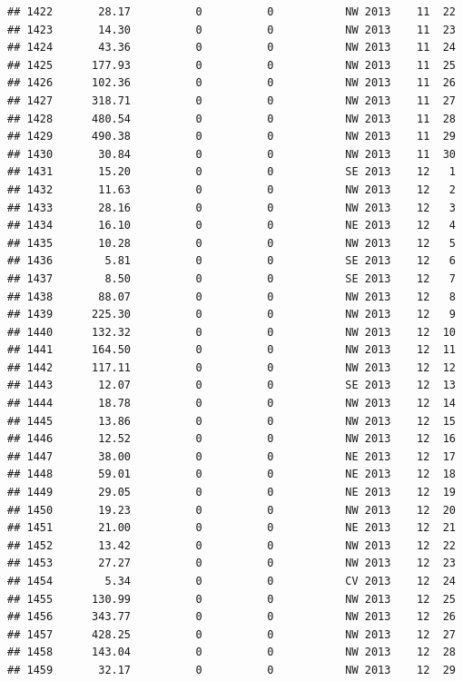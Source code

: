 \documentclass[
]{article}
\begin{document}
\begin{verbatim}
## 1422       28.17          0          0           NW 2013    11  22
## 1423       14.30          0          0           NW 2013    11  23
## 1424       43.36          0          0           NW 2013    11  24
## 1425      177.93          0          0           NW 2013    11  25
## 1426      102.36          0          0           NW 2013    11  26
## 1427      318.71          0          0           NW 2013    11  27
## 1428      480.54          0          0           NW 2013    11  28
## 1429      490.38          0          0           NW 2013    11  29
## 1430       30.84          0          0           NW 2013    11  30
## 1431       15.20          0          0           SE 2013    12   1
## 1432       11.63          0          0           NW 2013    12   2
## 1433       28.16          0          0           NW 2013    12   3
## 1434       16.10          0          0           NE 2013    12   4
## 1435       10.28          0          0           NW 2013    12   5
## 1436        5.81          0          0           SE 2013    12   6
## 1437        8.50          0          0           SE 2013    12   7
## 1438       88.07          0          0           NW 2013    12   8
## 1439      225.30          0          0           NW 2013    12   9
## 1440      132.32          0          0           NW 2013    12  10
## 1441      164.50          0          0           NW 2013    12  11
## 1442      117.11          0          0           NW 2013    12  12
## 1443       12.07          0          0           SE 2013    12  13
## 1444       18.78          0          0           NW 2013    12  14
## 1445       13.86          0          0           NW 2013    12  15
## 1446       12.52          0          0           NW 2013    12  16
## 1447       38.00          0          0           NE 2013    12  17
## 1448       59.01          0          0           NE 2013    12  18
## 1449       29.05          0          0           NE 2013    12  19
## 1450       19.23          0          0           NW 2013    12  20
## 1451       21.00          0          0           NE 2013    12  21
## 1452       13.42          0          0           NW 2013    12  22
## 1453       27.27          0          0           NW 2013    12  23
## 1454        5.34          0          0           CV 2013    12  24
## 1455      130.99          0          0           NW 2013    12  25
## 1456      343.77          0          0           NW 2013    12  26
## 1457      428.25          0          0           NW 2013    12  27
## 1458      143.04          0          0           NW 2013    12  28
## 1459       32.17          0          0           NW 2013    12  29

\end{verbatim}
\end{document}
